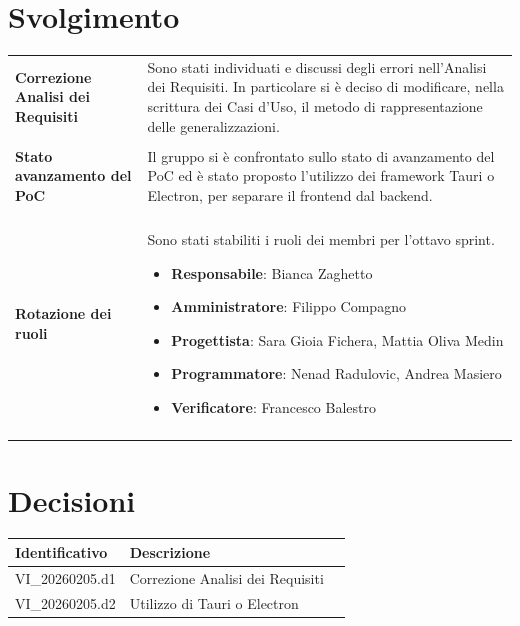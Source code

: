 \documentclass[a4paper,12pt]{article}
\begin{document}
    \section{Svolgimento} {
        \begin{longtable}{P{5cm}|P{10cm}} 
            \textbf{Correzione Analisi dei Requisiti} & 
            Sono stati individuati e discussi degli errori nell'Analisi dei Requisiti. In particolare si è deciso di modificare, nella scrittura dei Casi d'Uso, il metodo di rappresentazione delle generalizzazioni.\\\\
            \textbf{Stato avanzamento del PoC} & Il gruppo si è confrontato sullo stato di avanzamento del PoC ed è stato proposto l'utilizzo dei framework Tauri o Electron, per separare il frontend dal backend.\\\\
            \textbf{Rotazione dei ruoli} & Sono stati stabiliti i ruoli dei membri per l'ottavo sprint.
            \begin{itemize}
                \item \textbf{Responsabile}: Bianca Zaghetto
                \item \textbf{Amministratore}: Filippo Compagno
                \item \textbf{Progettista}: Sara Gioia Fichera, Mattia Oliva Medin
                \item \textbf{Programmatore}: Nenad Radulovic, Andrea Masiero
                \item \textbf{Verificatore}: Francesco Balestro
            \end{itemize}\\\\
        \end{longtable}
    }

    \section{Decisioni} {
        \begin{tabularx}{\textwidth}{|l|X|l|}
            \hline
            \textbf{Identificativo} & \textbf{Descrizione}\\
            \hline
            VI\_20260205.d1 & Correzione Analisi dei Requisiti\\
            \hline
            VI\_20260205.d2 & Utilizzo di Tauri o Electron\\
            \hline
        \end{tabularx}
    }
\end{document}
